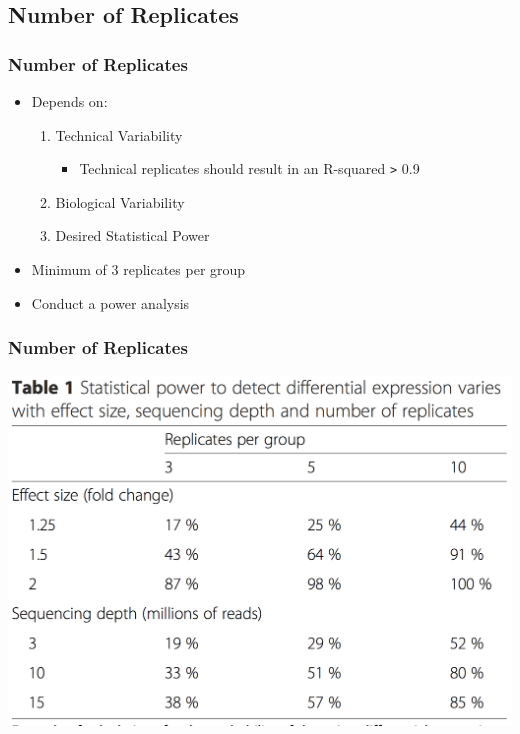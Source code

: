 \documentclass[14pt]{beamer}
\begin{document}
\subsection{Number of Replicates}

\begin{frame}
\frametitle{Number of Replicates}
\begin{itemize}
	\item<1-> Depends on:
	\begin{enumerate}
	\item<2-> Technical Variability
	\begin{itemize}
		\item<3-> Technical replicates should result in an R-squared \texttt{>} 0.9
	\end{itemize}
	\item<4-> Biological Variability
	\item<5-> Desired Statistical Power
	\end{enumerate}
	\item<6-> Minimum of 3 replicates per group
	\item<7-> Conduct a power analysis
\end{itemize}
\end{frame}

\begin{frame}
\frametitle{Number of Replicates}
	\begin{center}
    	\includegraphics[width=.8\textwidth]{images_20171003_power_analysis.png}
    \end{center}
\end{frame}


\end{document}
